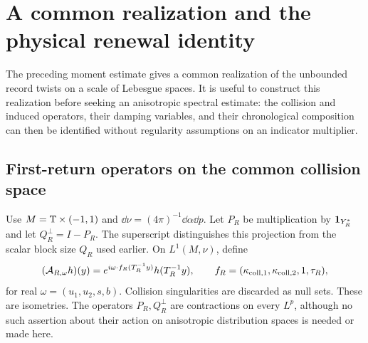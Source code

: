 \section{A common realization and the physical renewal identity}
\label{sec:common-renewal}
The preceding moment estimate gives a common realization of the
unbounded record twists on a scale of Lebesgue spaces. It is useful to
construct this realization before seeking an anisotropic spectral
estimate: the collision and induced operators, their damping variables,
and their chronological composition can then be identified without
regularity assumptions on an indicator multiplier.

\subsection{First-return operators on the common collision space}
Use $M=\mathbb T\times(-1,1)$ and $\dd\nu=(4\pi)^{-1}\dd\alpha\dd p$.
Let $P_R$ be multiplication by $\mathbf1_{Y_R^*}$ and let $Q_R^\perp=I-P_R$.
The superscript distinguishes this projection from the scalar block
size $Q_R$ used earlier. On $L^1(M,\nu)$, define
\[
 (\mathcal A_{R,\omega}h)(y)
   =e^{i\omega\cdot f_R(T_R^{-1}y)}h(T_R^{-1}y),\qquad
 f_R=(\kappa_{{\rm coll},1},\kappa_{{\rm coll},2},1,\tau_R),
\]
for real $\omega=(u_1,u_2,s,b)$. Collision singularities are discarded
as null sets. These are isometries. The operators $P_R,Q_R^\perp$ are
contractions on every $L^p$, although no such assertion about their
action on anisotropic distribution spaces is needed or made here.


